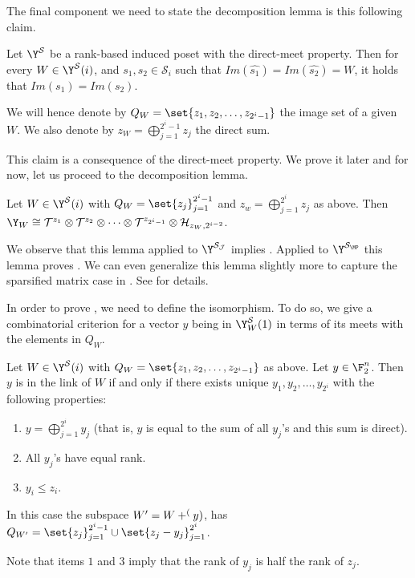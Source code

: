 The final component we need to state the decomposition lemma is this following claim.

\begin{claim} \label{claim:uniqueness-of-image-set-ranks}
    Let \(\Y^\mathcal{S}\) be a rank-based induced poset with the direct-meet property. Then for every \(W \in \Y^{\mathcal{S}}(i)\), and \(s_1,s_2 \in \mathcal{S}_i\) such that \(Im(\widehat{s_1})=Im(\widehat{s_2}) = W\), it holds that \(Im(s_1) = Im(s_2)\).
\end{claim}
We will hence denote by \(Q_W = \set{z_1,z_2,\dots,z_{2^i-1}}\) the image set of a given \(W\). We also denote by \(z_W = \bigoplus_{j=1}^{2^i-1}z_j\) the direct sum.

This claim is a consequence of the direct-meet property. We prove it later and for now, let us proceed to the decomposition lemma.

\begin{lemma}\label{lem:generalized-decomposition-lemma}
    Let \(W \in \Y^{\mathcal{S}}(i)\) with \(Q_W = \set{z_j}_{j=1}^{2^i - 1}\) and \(z_w = \bigoplus_{j=1}^{2^i} z_j\) as above. Then \(\Y_W \cong \mathcal{T}^{z_1} \otimes \mathcal{T}^{z_2} \otimes \dots \otimes \mathcal{T}^{z_{2^i-1}} \otimes \mathcal{H}_{z_W,2^{i-2}}\).
\end{lemma}

We observe that this lemma applied to \(\Y^{\mathcal{S}_{\mathcal{J}}}\) implies . Applied to \(\Y^{\mathcal{S}_{\MP}}\) this lemma proves . We can even generalize this lemma slightly more to capture the sparsified matrix case in . See  for details.

In order to prove , we need to define the isomorphism. To do so, we give a combinatorial criterion for a vector \(y\) being in \(\Y_W^{\mathcal{S}}(1)\) in terms of its meets with the elements in \(Q_W\). 

\begin{claim} \label{claim:abstract-unique-decomposition}
    Let \(W \in \Y^{\mathcal{S}}(i)\) with \(Q_W = \set{z_1,z_2,\dots,z_{2^i-1}}\) as above. Let \(y \in \F_2^n\). Then \(y\) is in the link of \(W\) if and only if there exists unique \(y_1,y_2,\dots,y_{2^i}\) with the following properties:
    \begin{enumerate}
        \item \(y = \bigoplus_{j=1}^{2^i} y_j\) (that is, \(y\) is equal to the sum of all \(y_j\)'s and this sum is direct).
        \item All \(y_j\)'s have equal rank.
        \item \(y_i \leq z_i\).
    \end{enumerate}
    In this case the subspace \(W' = W + \sp(y)\), has \(Q_{W'} = \set{z_j}_{j=1}^{2^i-1} \cup \set{z_j - y_j}_{j=1}^{2^i}\).
\end{claim}
Note that items \(1\) and \(3\) imply that the rank of \(y_j\) is half the rank of \(z_j\).

